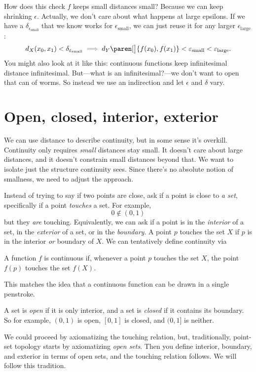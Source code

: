 \documentclass[a5paper]{scrbook}
\let\oldimplies\implies
\def\implies{\color{gray}\oldimplies\color{black}}
\begin{document}
How does this check \(f\) keeps small distances small? Because we can keep shrinking \(\epsilon\). Actually, we don't care about what happens at large epsilons. If we have a \(\delta_{\epsilon_{\text{small}}}\) that we know works for \(\epsilon_{\text{small}}\), we can just reuse it for any larger \(\epsilon_{\text{large}}\):
  \[
   d_X(x_0,x_1) < \delta_{\epsilon_{\text{small}}}\implies d_Y\paren[\big]{f(x_0),f(x_1)} < \epsilon_{\text{small}} < \epsilon_{\text{large}}. 
  \]
  You might also look at it like this: continuous functions keep infinitesimal distance infinitesimal. But---what is an infinitesimal?---we don't want to open that can of worms. So instead we use an indirection and let \(\epsilon\) and \(\delta\) vary. 

  \section{Open, closed, interior, exterior}
  We can use distance to describe continuity, but in some sense it's overkill. 
  Continuity only requires \emph{small} distances stay small. It doesn't care about large distances, and it doesn't constrain small distances beyond that. We want to isolate just the structure continuity sees. Since there's no absolute notion of smallness, we need to adjust the approach.

  Instead of trying to say if two points are close, ask if a point is close to \emph{a set}, specifically if a point \emph{touches} a set. For example,
  \[
    0\notin (0,1)
  \]
  but they \emph{are} touching. Equivalently, we can ask if a point is in the \emph{interior} of a set, in the \emph{exterior} of a set, or in the \emph{boundary}. A point \(p\) touches the set \(X\) if \(p\) is in the interior \emph{or} boundary of \(X\). We can tentatively define continuity via
  \begin{defn}
    A function \(f\) is continuous if, whenever a point \(p\) touches the set \(X\), the point \(f(p)\) touches the set \(f(X)\). 
  \end{defn}
  This matches the idea that a continuous function can be drawn in a single penstroke. 
  
  A set is \emph{open} if it is only interior, and a set is \emph{closed} if it contains its boundary. So for example, \((0,1)\) is open, \([0,1]\) is closed, and \((0,1]\) is neither. 

  We could proceed by axiomatizing the touching relation, but, traditionally, point-set topology starts by axiomatizing \emph{open sets}. Then you define interior, boundary, and exterior in terms of open sets, and the touching relation follows. We will follow this tradition. 
\end{document}
